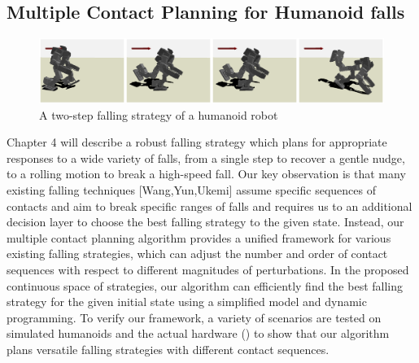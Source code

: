 \subsection{Multiple Contact Planning for Humanoid falls}
\begin{figure}[h]
  \begin{center}
    \includegraphics[width=1.0\textwidth]{images/intro_gp_tripod}
  \end{center}
  \caption{A two-step falling strategy of a humanoid robot}
  \label{fig:intro_hardware}
\end{figure}
Chapter 4 will describe a robust falling strategy which plans for appropriate 
responses to a wide variety of falls, from a single step to recover a gentle
nudge, to a rolling motion to break a high-speed fall.
Our key observation is that  many existing falling techniques [Wang,Yun,Ukemi]
assume specific sequences of contacts and aim to break specific ranges of
falls and requires us to an additional decision layer to choose the best
falling strategy to the given state.
Instead, our multiple contact planning algorithm provides a unified framework
for various existing falling strategies, which can adjust the number and order
of contact sequences with respect to different magnitudes of perturbations.
In the proposed continuous space of strategies, our algorithm can efficiently
find the best falling strategy for the given initial state using a simplified
model and dynamic  programming.
To verify our framework, a variety of scenarios are tested on simulated
humanoids and the actual hardware () to show that our
algorithm plans versatile falling strategies with different contact sequences.

